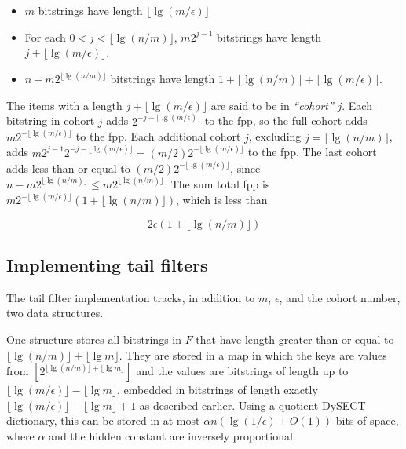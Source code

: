 \documentclass[11pt,letterpaper]{article}
\begin{document}
\begin {itemize}
\item $m$ bitstrings have length $\lfloor \lg (m / \epsilon) \rfloor$
\item For each $0 < j < \lfloor \lg (n/m) \rfloor $, $m2^{j-1}$ bitstrings have length $j + \lfloor \lg (m / \epsilon) \rfloor$.
\item $n - m2^{\lfloor \lg (n/m) \rfloor}$ bitstrings have length $1 + \lfloor \lg (n/m) \rfloor  + \lfloor \lg (m / \epsilon) \rfloor$.
\end {itemize}

The items with a length $j + \lfloor \lg (m / \epsilon) \rfloor$ are said to be in {\em ``cohort''} $j$.
Each bitstring in cohort $j$ adds $2^{- j - \lfloor \lg (m / \epsilon) \rfloor}$ to the fpp, so the full cohort adds $m2^{- \lfloor \lg (m / \epsilon) \rfloor}$ to the fpp.
Each additional cohort $j$, excluding $j = \lfloor \lg (n/m) \rfloor$, adds $m 2^{j-1} 2^{-j - \lfloor \lg (m / \epsilon) \rfloor} = (m/2) 2^{-\lfloor \lg (m / \epsilon) \rfloor}$ to the fpp.
The last cohort adds less than or equal to $(m/2) 2^{-\lfloor \lg (m / \epsilon) \rfloor}$, since $n - m 2^{\lfloor \lg (n/m) \rfloor} \leq m 2^{\lfloor \lg(n/m)\rfloor}$.
The sum total fpp is $m 2^{- \lfloor \lg (m / \epsilon) \rfloor} (1 + \lfloor \lg (n/m) \rfloor)$, which is less than

\begin{equation}
  2 \epsilon (1 + \lfloor \lg (n/m) \rfloor)
\end{equation}

\subsection{Implementing tail filters}

The tail filter implementation tracks, in addition to $m$, $\epsilon$, and the cohort number, two data structures.

One structure stores all bitstrings in $F$ that have length greater than or equal to $\lfloor \lg (n/m) \rfloor + \lfloor \lg m \rfloor$.
They are stored in a map in which the keys are values from $[2^{\lfloor \lg (n/m) \rfloor + \lfloor \lg m \rfloor}]$ and the values are bitstrings of length up to $\lfloor \lg (m/\epsilon) \rfloor - \lfloor \lg m \rfloor$, embedded in bitstrings of length exactly $\lfloor \lg (m/\epsilon) \rfloor - \lfloor \lg m \rfloor + 1$ as described earlier.
Using a quotient DySECT dictionary, this can be stored in at most $\alpha n (\lg (1/\epsilon) + O(1))$ bits of space, where $\alpha$ and the hidden constant are inversely proportional.
\end{document}
